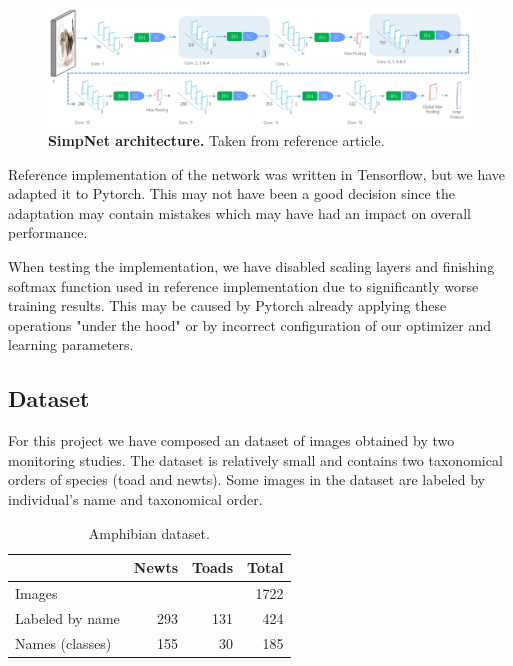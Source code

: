 \documentclass[fleqn,moreauthors,10pt]{ds_report}
\begin{document}
\begin{figure}[htb]\centering
	\includegraphics[width=\linewidth]{simpnet-arch.png}
	\caption{\textbf{SimpNet architecture.} Taken from reference article.}
	\label{fig:simpet-arch}
\end{figure}

Reference implementation of the network was written in Tensorflow, but we have adapted it to Pytorch. This may not have been a good decision since the adaptation may contain mistakes which may have had an impact on overall performance.

When testing the implementation, we have disabled scaling layers and finishing softmax function used in reference implementation due to significantly worse training results. This may be caused by Pytorch already applying these operations "under the hood" or by incorrect configuration of our optimizer and learning parameters.

\subsection*{Dataset}

For this project we have composed an dataset of images obtained by two monitoring studies. The dataset is relatively small and contains two taxonomical orders of species (toad and newts). Some images in the dataset are labeled by individual's name and taxonomical order.

\begin{table}[hbt]
	\caption{Amphibian dataset.}
	\centering
	\begin{tabular}{l | r r r}
		\toprule
		\cmidrule(r){1-1}
		                  & Newts  & Toads    & Total \\
		\midrule
		Images            &        &          & 1722  \\
		Labeled by name   & 293    & 131      & 424   \\
		Names (classes)   & 155    & 30       & 185   \\
		\bottomrule
	\end{tabular}
	\label{tab:amphibian-dataset}
\end{table}
\end{document}
